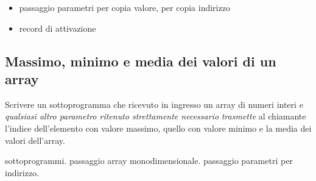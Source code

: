 \begin{itemize}
\item passaggio parametri per copia valore, per copia indirizzo
\item record di attivazione
\end{itemize}

\subsection{Massimo, minimo e media dei valori di un array}
Scrivere un sottoprogramma che ricevuto in ingresso un array di numeri interi e \textit{qualsiasi altro parametro ritenuto strettamente necessario} \textit{trasmette} al chiamante l'indice dell'elemento con valore massimo, quello con valore minimo e la media dei valori dell'array.

\begin{tags}
sottoprogrammi. passaggio array monodimensionale. passaggio parametri per indirizzo.
\end{tags}



